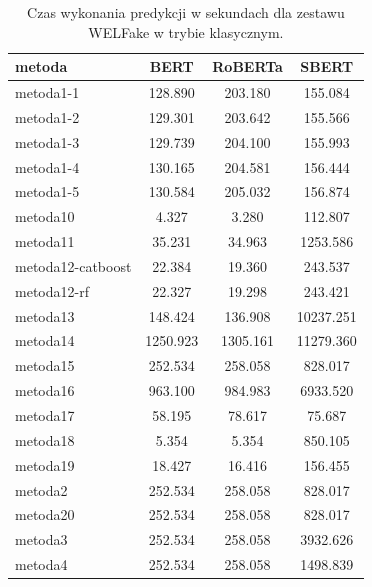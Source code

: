 \begin{table}[H]
	\centering
	\caption{Czas wykonania predykcji w sekundach dla zestawu WELFake w trybie klasycznym.}
	\label{tab:execution_time_welfake_classic}
	\small
	\begin{tabular}{lccc}
		\toprule
		\textbf{metoda}   & \textbf{BERT} & \textbf{RoBERTa} & \textbf{SBERT} \\
		\midrule
		metoda1-1         & 128.890       & 203.180          & 155.084        \\
		metoda1-2         & 129.301       & 203.642          & 155.566        \\
		metoda1-3         & 129.739       & 204.100          & 155.993        \\
		metoda1-4         & 130.165       & 204.581          & 156.444        \\
		metoda1-5         & 130.584       & 205.032          & 156.874        \\
		metoda10          & 4.327         & 3.280            & 112.807        \\
		metoda11          & 35.231        & 34.963           & 1253.586       \\
		metoda12-catboost & 22.384        & 19.360           & 243.537        \\
		metoda12-rf       & 22.327        & 19.298           & 243.421        \\
		metoda13          & 148.424       & 136.908          & 10237.251      \\
		metoda14          & 1250.923      & 1305.161         & 11279.360      \\
		metoda15          & 252.534       & 258.058          & 828.017        \\
		metoda16          & 963.100       & 984.983          & 6933.520       \\
		metoda17          & 58.195        & 78.617           & 75.687         \\
		metoda18          & 5.354         & 5.354            & 850.105        \\
		metoda19          & 18.427        & 16.416           & 156.455        \\
		metoda2           & 252.534       & 258.058          & 828.017        \\
		metoda20          & 252.534       & 258.058          & 828.017        \\
		metoda3           & 252.534       & 258.058          & 3932.626       \\
		metoda4           & 252.534       & 258.058          & 1498.839       \\

\end{tabular}
\end{table}
